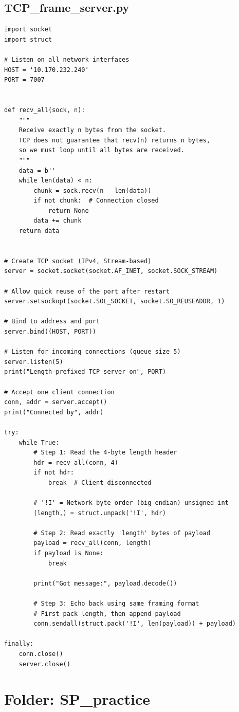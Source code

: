 \documentclass[11pt,a4paper]{article}
\begin{document}
\subsection*{TCP\_frame\_server.py}
\begin{lstlisting}[style=labcode]
import socket
import struct

# Listen on all network interfaces
HOST = '10.170.232.240'
PORT = 7007


def recv_all(sock, n):
    """
    Receive exactly n bytes from the socket.
    TCP does not guarantee that recv(n) returns n bytes,
    so we must loop until all bytes are received.
    """
    data = b''
    while len(data) < n:
        chunk = sock.recv(n - len(data))
        if not chunk:  # Connection closed
            return None
        data += chunk
    return data


# Create TCP socket (IPv4, Stream-based)
server = socket.socket(socket.AF_INET, socket.SOCK_STREAM)

# Allow quick reuse of the port after restart
server.setsockopt(socket.SOL_SOCKET, socket.SO_REUSEADDR, 1)

# Bind to address and port
server.bind((HOST, PORT))

# Listen for incoming connections (queue size 5)
server.listen(5)
print("Length-prefixed TCP server on", PORT)

# Accept one client connection
conn, addr = server.accept()
print("Connected by", addr)

try:
    while True:
        # Step 1: Read the 4-byte length header
        hdr = recv_all(conn, 4)
        if not hdr:
            break  # Client disconnected

        # '!I' = Network byte order (big-endian) unsigned int
        (length,) = struct.unpack('!I', hdr)

        # Step 2: Read exactly 'length' bytes of payload
        payload = recv_all(conn, length)
        if payload is None:
            break

        print("Got message:", payload.decode())

        # Step 3: Echo back using same framing format
        # First pack length, then append payload
        conn.sendall(struct.pack('!I', len(payload)) + payload)

finally:
    conn.close()
    server.close()
\end{lstlisting}

\section{Folder: SP\_practice}
\end{document}
